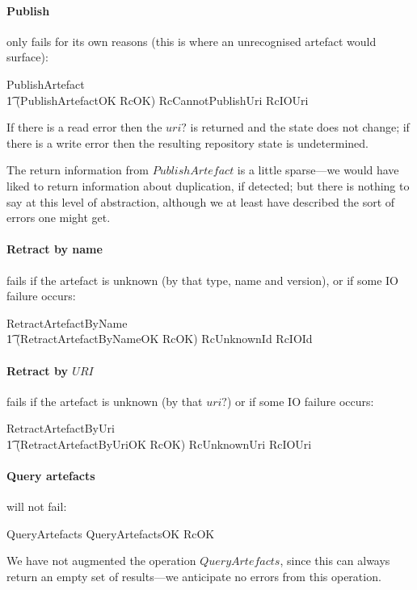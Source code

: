 \documentclass[a4paper,titlepage,twoside,12pt]{article}
\begin{document}
\paragraph{Publish}
only fails for its own reasons (this is where an unrecognised artefact would surface):
\begin{zed}
	PublishArtefact  \\
	\t1 (PublishArtefactOK \land RcOK) \lor RcCannotPublishUri \lor RcIOUri
\end{zed}
If there is a read error then the $uri?$ is returned and the state does not change; if there is a write error then
the resulting repository state is undetermined.

The return information from $PublishArtefact$ is a little sparse---we would have liked to return information about duplication, if detected; but there is nothing to say at this level of abstraction, although we at least have described the sort of errors one might get.

\paragraph{Retract by name}
fails if the artefact is unknown (by that type, name and version), or if some IO failure occurs:
\begin{zed}
	RetractArtefactByName  \\
	\t1 (RetractArtefactByNameOK \land RcOK) \lor RcUnknownId \lor RcIOId
\end{zed}

\paragraph{Retract by $URI$}
fails if the artefact is unknown (by that $uri?$) or if some IO failure occurs:
\begin{zed}
	RetractArtefactByUri  \\
	\t1 (RetractArtefactByUriOK \land RcOK) \lor RcUnknownUri \lor RcIOUri
\end{zed}

\paragraph{Query artefacts}
will not fail:
\begin{zed}
	QueryArtefacts  QueryArtefactsOK \land RcOK
\end{zed}
We have not augmented the operation $QueryArtefacts$, since this can always return an empty set of results---we anticipate no errors from this operation.
\end{document}
